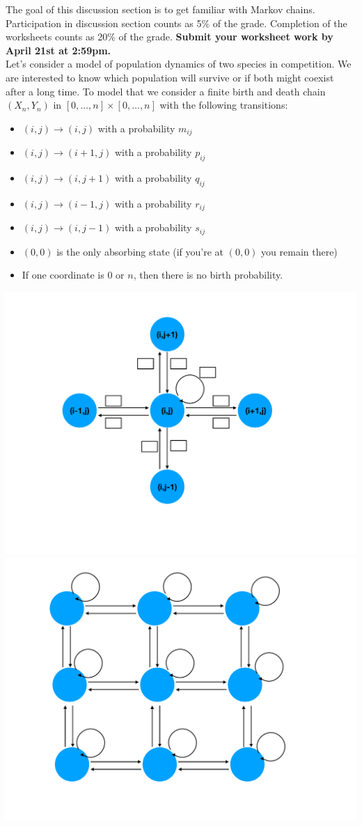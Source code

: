 \documentclass[11pt]{article}
\begin{document}
The goal of this discussion section is to get familiar with Markov chains.\\

Participation in discussion section counts as 5\% of the grade. Completion of the worksheets counts as 20\% of the grade. \textbf{Submit your worksheet work by {April 21st} at 2:59pm.}\\

Let's consider a model of population dynamics of two species in competition. We are interested to know which population will survive or if both might coexist after a long time. To model that we consider a finite birth and death chain $(X_n, Y_n)$ in $[0, \dots, n] \times [0, \dots, n] $  with the following transitions:
\begin{itemize}
\item $(i,j) \to (i,j)$ with a probability $m_{ij}$
\item $(i,j) \to (i+1,j)$ with a probability $p_{ij}$
\item $(i,j) \to (i,j+1)$ with a probability $q_{ij}$
\item $(i,j) \to (i-1,j)$ with a probability $r_{ij}$
\item $(i,j) \to (i,j-1)$ with a probability $s_{ij}$
\item $(0,0)$ is the only absorbing state (if you're at $(0,0)$ you remain there)
\item If one coordinate is $0$ or $n$, then there is no birth probability.
\end{itemize}
\includegraphics[width=0.5\linewidth]{fig1.pdf}
\includegraphics[width=0.5\linewidth]{fig2.pdf}
\end{document}
